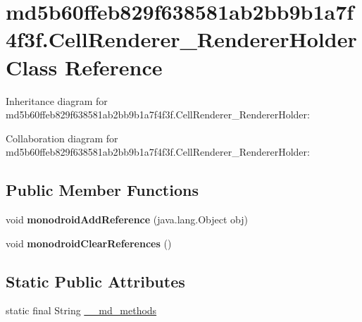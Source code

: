 \hypertarget{classmd5b60ffeb829f638581ab2bb9b1a7f4f3f_1_1_cell_renderer___renderer_holder}{}\section{md5b60ffeb829f638581ab2bb9b1a7f4f3f.\+Cell\+Renderer\+\_\+\+Renderer\+Holder Class Reference}
\label{classmd5b60ffeb829f638581ab2bb9b1a7f4f3f_1_1_cell_renderer___renderer_holder}


Inheritance diagram for md5b60ffeb829f638581ab2bb9b1a7f4f3f.\+Cell\+Renderer\+\_\+\+Renderer\+Holder\+:


Collaboration diagram for md5b60ffeb829f638581ab2bb9b1a7f4f3f.\+Cell\+Renderer\+\_\+\+Renderer\+Holder\+:
\subsection*{Public Member Functions}
\begin{DoxyCompactItemize}
\item 
\mbox{\label{classmd5b60ffeb829f638581ab2bb9b1a7f4f3f_1_1_cell_renderer___renderer_holder_a9dfe45e5cb1c36ddbfe31a4068cb0394}} 
void {\bfseries monodroid\+Add\+Reference} (java.\+lang.\+Object obj)
\item 
\mbox{\label{classmd5b60ffeb829f638581ab2bb9b1a7f4f3f_1_1_cell_renderer___renderer_holder_a21da82531ee5902ab97748aa2bb500c6}} 
void {\bfseries monodroid\+Clear\+References} ()
\end{DoxyCompactItemize}
\subsection*{Static Public Attributes}
\begin{DoxyCompactItemize}
\item 
static final String \hyperlink{classmd5b60ffeb829f638581ab2bb9b1a7f4f3f_1_1_cell_renderer___renderer_holder_a4578cafbc2b812d71e4d477b6ee135b3}{\+\_\+\+\_\+md\+\_\+methods}
\end{DoxyCompactItemize}


